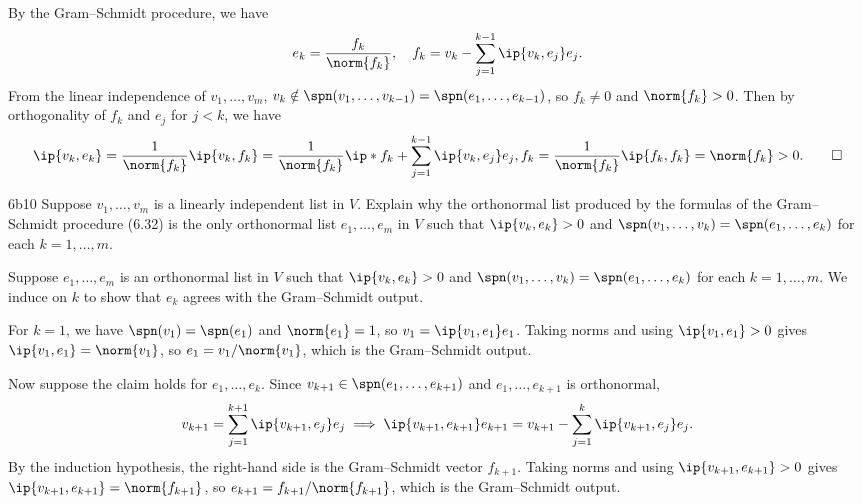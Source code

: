 \begin{sol}
    By the Gram--Schmidt procedure, we have
    \[
        e_k = \frac{f_k}{\norm{f_k}}, \quad f_k = v_k - \sum_{j=1}^{k-1}\ip{v_k, e_j}e_j.
    \]
    From the linear independence of $v_1, \ldots, v_m$, $v_k \notin \spn(v_1, \ldots, v_{k-1}) = \spn(e_1, \ldots, e_{k-1})$, so $f_k \neq 0$ and $\norm{f_k} > 0$.
    Then by orthogonality of $f_k$ and $e_j$ for $j < k$, we have
    \[
        \ip{v_k, e_k} = \frac{1}{\norm{f_k}}\ip{v_k, f_k} = \frac{1}{\norm{f_k}}\ip*{f_k + \sum_{j=1}^{k-1}\ip{v_k, e_j}e_j, f_k} = \frac{1}{\norm{f_k}}\ip{f_k, f_k} = \norm{f_k} > 0. \qedhere
    \]
\end{sol}

\begin{exercise}{6b10}
    Suppose $v_1, \ldots, v_m$ is a linearly independent list in $V$.
    Explain why the orthonormal list produced by the formulas of the Gram--Schmidt procedure (6.32) is the only orthonormal list $e_1, \ldots, e_m$ in $V$ such that $\ip{v_k, e_k} > 0$ and $\spn(v_1, \ldots, v_k) = \spn(e_1, \ldots, e_k)$ for each $k = 1, \ldots, m$.

\end{exercise}

\begin{sol}
    Suppose $e_1, \ldots, e_m$ is an orthonormal list in $V$ such that $\ip{v_k, e_k} > 0$ and $\spn(v_1, \ldots, v_k) = \spn(e_1, \ldots, e_k)$ for each $k = 1, \ldots, m$.
    We induce on $k$ to show that $e_k$ agrees with the Gram--Schmidt output.

    For $k = 1$, we have $\spn(v_1) = \spn(e_1)$ and $\norm{e_1} = 1$, so $v_1 = \ip{v_1, e_1} e_1$.
    Taking norms and using $\ip{v_1, e_1} > 0$ gives $\ip{v_1, e_1} = \norm{v_1}$, so $e_1 = v_1 / \norm{v_1}$, which is the Gram--Schmidt output.

    Now suppose the claim holds for $e_1, \ldots, e_k$.
    Since $v_{k+1} \in \spn(e_1, \ldots, e_{k+1})$ and $e_1, \ldots, e_{k+1}$ is orthonormal,
    \[
        v_{k+1} = \sum_{j=1}^{k+1} \ip{v_{k+1}, e_j} e_j \implies \ip{v_{k+1}, e_{k+1}} e_{k+1} = v_{k+1} - \sum_{j=1}^{k} \ip{v_{k+1}, e_j} e_j.
    \]
    By the induction hypothesis, the right-hand side is the Gram--Schmidt vector $f_{k+1}$.
    Taking norms and using $\ip{v_{k+1}, e_{k+1}} > 0$ gives $\ip{v_{k+1}, e_{k+1}} = \norm{f_{k+1}}$, so $e_{k+1} = f_{k+1} / \norm{f_{k+1}}$, which is the Gram--Schmidt output.
\end{sol}

